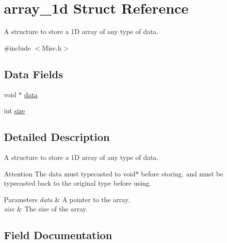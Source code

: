 \hypertarget{structarray__1d}{}\section{array\+\_\+1d Struct Reference}
\label{structarray__1d}


A structure to store a 1D array of any type of data.  




{\ttfamily \#include $<$Misc.\+h$>$}

\subsection*{Data Fields}
\begin{DoxyCompactItemize}
\item 
void $\ast$ \hyperlink{structarray__1d_a67bfd60aa42e5469ce9251b4632a6a30_a67bfd60aa42e5469ce9251b4632a6a30}{data}
\item 
int \hyperlink{structarray__1d_acec21fd8404b40eb2b39d5880a6afc45_acec21fd8404b40eb2b39d5880a6afc45}{size}
\end{DoxyCompactItemize}


\subsection{Detailed Description}
A structure to store a 1D array of any type of data. 

\begin{DoxyAttention}{Attention}
The data must typecasted to void$\ast$ before storing. and must be typecasted back to the original type before using. 
\end{DoxyAttention}

\begin{DoxyParams}{Parameters}
{\em data} & A pointer to the array. \\
\hline
{\em size} & The size of the array. \\
\hline
\end{DoxyParams}


\subsection{Field Documentation}
\mbox{\label{structarray__1d_a67bfd60aa42e5469ce9251b4632a6a30_a67bfd60aa42e5469ce9251b4632a6a30}} 
